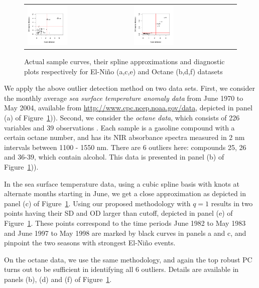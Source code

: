 \begin{figure}
\begin{center}
\begin{tabular}{ll}
\includegraphics[width=0.4\textwidth]{./Plots/Elnino_functional3} &
\includegraphics[width=0.4\textwidth]{./Plots/Octane_functional3}\\
\end{tabular}
\caption{Actual sample curves, their spline approximations and diagnostic plots respectively for El-Ni\~no (a,c,e) and Octane (b,d,f) datasets}
\label{fig:fPCAfig}
\end{center}
\end{figure}

We apply the above outlier detection method on two data sets. First, we consider the 
monthly average \textit{sea surface temperature anomaly data} 
from June 1970 to May 2004, available 
from \url{http://www.cpc.ncep.noaa.gov/data}, depicted in  panel (a) 
of Figure~\ref{fig:fPCAfig})).
Second, we consider the \textit{octane data}, which consists of 226 variables and 39 
observations \citep{ref:EsbensenetalBook94}. 
Each sample is a gasoline compound with a certain octane 
number, and has its NIR absorbance spectra measured in 2 nm intervals between 1100 - 1550 
nm. There are 6 outliers here: compounds 25, 26 and 36-39, which contain alcohol. This 
data is presented in  panel (b) of Figure~\ref{fig:fPCAfig})).

In the sea surface temperature data, using a cubic spline basis with knots at alternate 
months starting in June, we get a close approximation as depicted in 
panel (c) of Figure~\ref{fig:fPCAfig}. Using our proposed methodology with $q =1$ 
results in two points having their SD and OD larger than cutoff, depicted in  
panel (e) of Figure~\ref{fig:fPCAfig}. These points correspond to the time periods June 
1982 to May 1983 and June 1997 to May 1998 are marked by black curves in panels a and c, 
and pinpoint the two seasons with strongest El-Ni\~no events. 


On the octane data, we use the same methodology, 
 and again the top robust PC turns out to be sufficient in identifying all 6 outliers. 
 Details are available in  panels (b), (d) and (f) of Figure~\ref{fig:fPCAfig}.